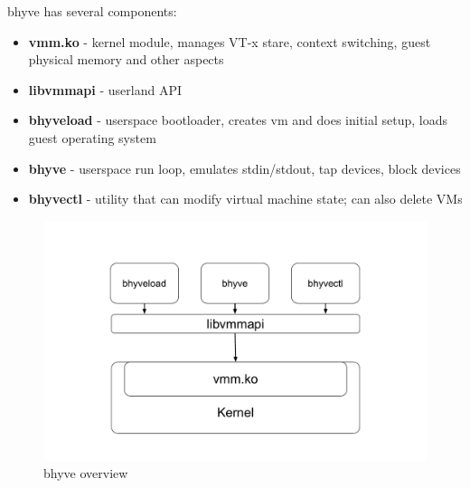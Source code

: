 bhyve has several components\cite{intr-bhyve}\cite{extending-bhyve}:
\begin{itemize}
\item
\textbf{vmm.ko} - kernel module, manages VT-x stare, context switching, guest physical memory and other aspects
\item
\textbf{libvmmapi} - userland API
\item
\textbf{bhyveload} - userspace bootloader, creates vm and does initial setup, loads guest operating system
\item
\textbf{bhyve} - userspace run loop, emulates stdin/stdout, tap devices, block devices
\item
\textbf{bhyvectl} - utility that can modify virtual machine state; can also delete VMs
\end{itemize}

\begin{figure}[ht]
\centering
  \includegraphics[width=.75\linewidth]{img/bhyve.pdf}
  \caption{bhyve overview}
\end{figure}
